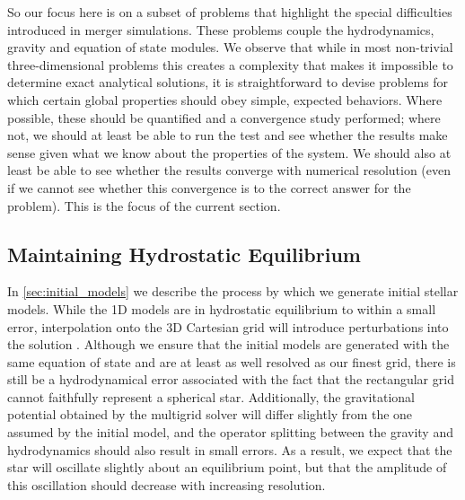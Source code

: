\documentclass[12pt]{article}
\begin{document}
So our focus here is on a subset of problems that highlight the special difficulties
introduced in merger simulations. These problems couple the hydrodynamics, gravity and
equation of state modules. We observe that while in most non-trivial
three-dimensional problems this creates a complexity that makes it
impossible to determine exact analytical solutions, it is
straightforward to devise problems for which certain global properties
should obey simple, expected behaviors. Where possible, these should
be quantified and a convergence study performed; where not, we should at least
be able to run the test and see whether the results make sense given what
we know about the properties of the system. We should also at least be able
to see whether the results converge with numerical resolution (even if we cannot
see whether this convergence is to the correct answer for the problem).
This is the focus of the current section.

\subsection{Maintaining Hydrostatic Equilibrium}
\label{sec:HSE}

In \autoref{sec:initial_models} we describe the process by which
we generate initial stellar models. While the 1D models are in
hydrostatic equilibrium to within a small error, interpolation onto
the 3D Cartesian grid will introduce perturbations into the solution
\citep{zingale:2002}. Although we ensure that the initial models are
generated with the same equation of state and are at least as well resolved as
our finest grid, there is still be a hydrodynamical error associated
with the fact that the rectangular grid cannot faithfully represent a
spherical star. Additionally, the gravitational potential obtained by
the multigrid solver will differ slightly from the one assumed by the
initial model, and the operator splitting between the gravity and
hydrodynamics should also result in small errors. As a result, we
expect that the star will oscillate slightly about an equilibrium
point, but that the amplitude of this oscillation should decrease with
increasing resolution.
\end{document}
